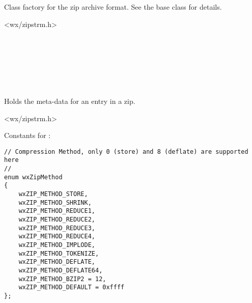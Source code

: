 %
%

\section{}\label{wxzipclassfactory}

Class factory for the zip archive format. See the base class
for details.




<wx/zipstrm.h>




\\
\\
\\
\\


%
%

\section{}\label{wxzipentry}

Holds the meta-data for an entry in a zip.




<wx/zipstrm.h>




Constants for :

\begin{verbatim}
// Compression Method, only 0 (store) and 8 (deflate) are supported here
//
enum wxZipMethod
{
    wxZIP_METHOD_STORE,
    wxZIP_METHOD_SHRINK,
    wxZIP_METHOD_REDUCE1,
    wxZIP_METHOD_REDUCE2,
    wxZIP_METHOD_REDUCE3,
    wxZIP_METHOD_REDUCE4,
    wxZIP_METHOD_IMPLODE,
    wxZIP_METHOD_TOKENIZE,
    wxZIP_METHOD_DEFLATE,
    wxZIP_METHOD_DEFLATE64,
    wxZIP_METHOD_BZIP2 = 12,
    wxZIP_METHOD_DEFAULT = 0xffff
};

\end{verbatim}

